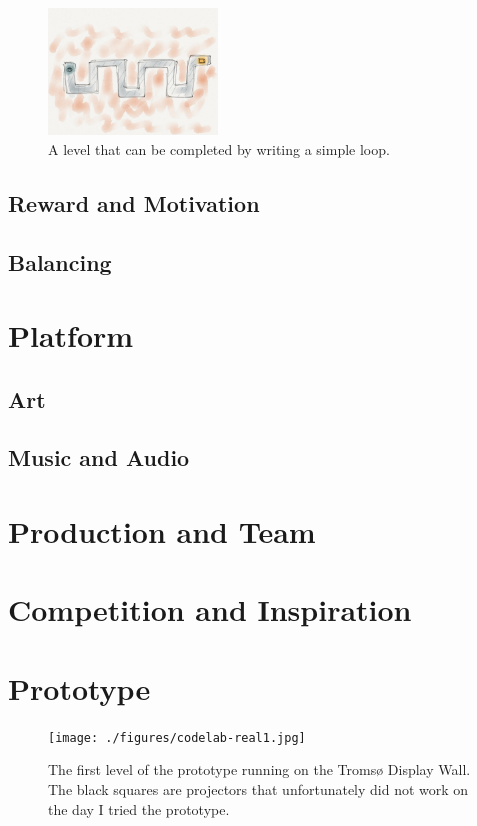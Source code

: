 \documentclass[12pt,journal,compsoc]{IEEEtran}
\begin{document}
\begin{figure}[htb]
    \begin{centering}
    \includegraphics[width=0.4\textwidth]{./figures/codelab4.jpg}
    \caption{A level that can be completed by writing a simple loop.} 
    \label{fig:loop}
    \end{centering} 
\end{figure}


\subsection{Reward and Motivation} 
\subsection{Balancing} 

\section{Platform} 
\subsection{Art} 
\subsection{Music and Audio}

\section{Production and Team} 
\section{Competition and Inspiration}
\section{Prototype} 

\begin{figure}[htb]
    \begin{centering}
    \texttt{[image: ./figures/codelab-real1.jpg]}
    \caption{The first level of the prototype running on the Tromsø Display
    Wall. The black squares are projectors that unfortunately did not work on
the day I tried the prototype.} 
    \label{fig:real1}
    \end{centering} 
\end{figure}
\end{document}
